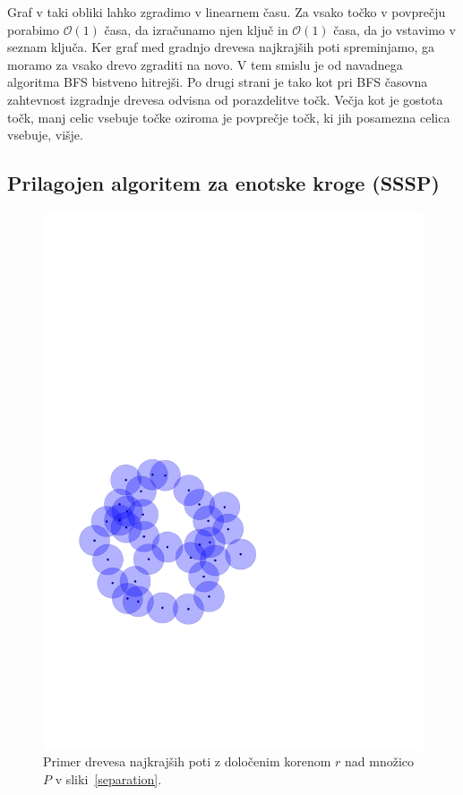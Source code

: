 \documentclass[a4paper, 12pt]{book}
\newcommand{\OO}{\ensuremath{\mathcal{O}}} %
\begin{document}
Graf v taki obliki lahko zgradimo v linearnem času. Za vsako točko v povprečju porabimo $\OO(1)$ časa, da izračunamo njen ključ in $\OO(1)$ časa, da jo vstavimo v seznam ključa. Ker graf med gradnjo drevesa najkrajših poti spreminjamo, ga moramo za vsako drevo zgraditi na novo. V tem smislu je od navadnega algoritma BFS bistveno hitrejši. Po drugi strani je tako kot pri BFS časovna zahtevnost izgradnje drevesa odvisna od porazdelitve točk. Večja kot je gostota točk, manj celic vsebuje točke oziroma je povprečje točk, ki jih posamezna celica vsebuje, višje.

\subsection{Prilagojen algoritem za enotske kroge (SSSP)}
\label{sssp-tree}

\begin{figure}
\centerline{\includegraphics[scale=0.6,page=6]{pics/unitdisks.pdf}}
\caption{Primer drevesa najkrajših poti z določenim korenom $r$ nad množico $P$ v sliki~\ref{separation}.}
\label{sssp-tree-ex}
\end{figure}
\end{document}
